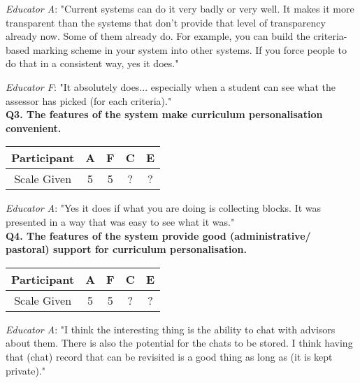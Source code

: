 \textit{Educator A}: "Current systems can do it very badly or very well. It makes it more transparent than
the systems that don't provide that level of transparency already now. Some of them already do. For example,
you can build the criteria-based marking scheme in your system into other systems. If you force people to do that
in a consistent way, yes it does."

\textit{Educator F}: "It absolutely does...
especially when a student can see what the assessor has picked (for each criteria)."\\

\textbf{Q3. The features of the system make curriculum personalisation convenient.}\\
\begin{table}[!ht]
	\centering
	\begin{tabularx}{0.325\textwidth}{|c|c|c|c|c|}
		\hline
		Participant & A                  & F                  & C & E \\
		\hline
		Scale Given & \cellcolor{green}5 & \cellcolor{green}5 & ? & ? \\
		\hline
	\end{tabularx}
\end{table}

\textit{Educator A}: "Yes it does if what you are doing is collecting blocks. It was presented in a way that was
easy to see what it was."
\\

\textbf{Q4. The features of the system provide good (administrative/ pastoral) support for curriculum personalisation.}\\
\begin{table}[!ht]
	\centering
	\begin{tabularx}{0.325\textwidth}{|c|c|c|c|c|}
		\hline
		Participant & A                  & F                  & C & E \\
		\hline
		Scale Given & \cellcolor{green}5 & \cellcolor{green}5 & ? & ? \\
		\hline
	\end{tabularx}
\end{table}

\textit{Educator A}: "I think the interesting thing is the ability to chat with advisors about them.
There is also the potential for the chats to be stored.
I think having that (chat) record that can be revisited is a good thing as long as (it is kept private)."

